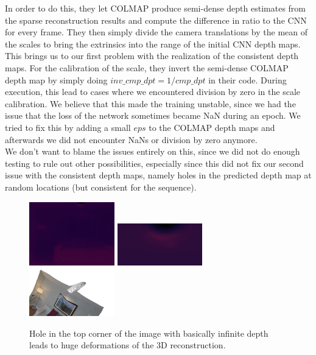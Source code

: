         In order to do this, they let COLMAP produce semi-dense depth estimates from the sparse reconstruction results and compute the difference in ratio to the CNN for every frame.
        They then simply divide the camera translations by the mean of the scales to bring the extrinsics into the range of the initial CNN depth maps.\\
        This brings us to our first problem with the realization of the consistent depth maps.
        For the calibration of the scale, they invert the semi-dense COLMAP depth map by simply doing $inv\_cmp\_dpt = 1 / cmp\_dpt$ in their code.
        During execution, this lead to cases where we encountered division by zero in the scale calibration.
        We believe that this made the training unstable, since we had the issue that the loss of the network sometimes became NaN during an epoch.
        We tried to fix this by adding a small $eps$ to the COLMAP depth maps and afterwards we did not encounter NaNs or division by zero anymore.\\
        We don't want to blame the issues entirely on this, since we did not do enough testing to rule out other possibilities, especially since this did not fix our second issue with the consistent depth maps, namely holes in the predicted depth map at random locations (but consistent for the sequence).\\
        \begin{figure}
            \centering
            \includegraphics[width=0.33\textwidth]{images/hole.png}
            \includegraphics[width=0.33\textwidth]{images/hole_zoom.png}
            \includegraphics[width=0.33\textwidth]{images/hole_recon.png}
            \caption{Hole in the top corner of the image with basically infinite depth leads to huge deformations of the 3D reconstruction.}
            \label{holes}
        \end{figure}
